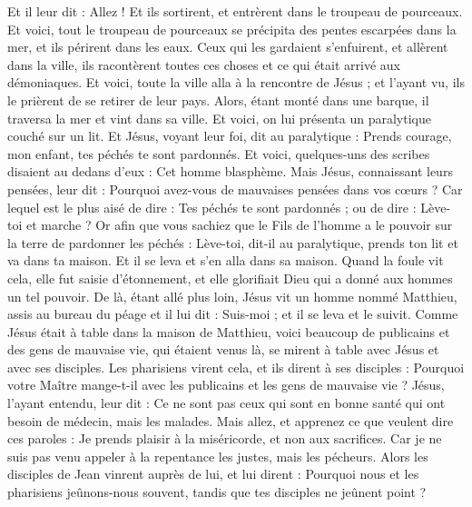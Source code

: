 \begin{multicols}{2}
Et il leur dit : Allez ! Et ils sortirent, et entrèrent dans le troupeau de pourceaux. Et voici, tout le troupeau de pourceaux se précipita des pentes escarpées dans la mer, et ils périrent dans les eaux.
Ceux qui les gardaient s'enfuirent, et allèrent dans la ville, ils racontèrent toutes ces choses et ce qui était arrivé aux démoniaques.
Et voici, toute la ville alla à la rencontre de Jésus ; et l'ayant vu, ils le prièrent de se retirer de leur pays.
\VerseOne{}Alors, étant monté dans une barque, il traversa la mer et vint dans sa ville.
Et voici, on lui présenta un paralytique couché sur un lit. Et Jésus, voyant leur foi, dit au paralytique : Prends courage, mon enfant, tes péchés te sont pardonnés.
Et voici, quelques-uns des scribes disaient au dedans d'eux : Cet homme blasphème.
Mais Jésus, connaissant leurs pensées, leur dit : Pourquoi avez-vous de mauvaises pensées dans vos cœurs ?
Car lequel est le plus aisé de dire : Tes péchés te sont pardonnés ; ou de dire : Lève-toi et marche ?
Or afin que vous sachiez que le Fils de l'homme a le pouvoir sur la terre de pardonner les péchés : Lève-toi, dit-il au paralytique, prends ton lit et va dans ta maison.
Et il se leva et s'en alla dans sa maison.
Quand la foule vit cela, elle fut saisie d'étonnement, et elle glorifiait Dieu qui a donné aux hommes un tel pouvoir.
De là, étant allé plus loin, Jésus vit un homme nommé Matthieu, assis au bureau du péage et il lui dit : Suis-moi ; et il se leva et le suivit.
Comme Jésus était à table dans la maison de Matthieu, voici beaucoup de publicains et des gens de mauvaise vie, qui étaient venus là, se mirent à table avec Jésus et avec ses disciples.
Les pharisiens virent cela, et ils dirent à ses disciples : Pourquoi votre Maître mange-t-il avec les publicains et les gens de mauvaise vie ?
Jésus, l'ayant entendu, leur dit : Ce ne sont pas ceux qui sont en bonne santé qui ont besoin de médecin, mais les malades.
Mais allez, et apprenez ce que veulent dire ces paroles : Je prends plaisir à la miséricorde, et non aux sacrifices. Car je ne suis pas venu appeler à la repentance les justes, mais les pécheurs.
Alors les disciples de Jean vinrent auprès de lui, et lui dirent : Pourquoi nous et les pharisiens jeûnons-nous souvent, tandis que tes disciples ne jeûnent point ?

\end{multicols}
